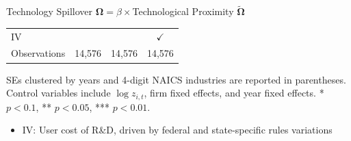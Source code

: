 \documentclass[
  10pt,
  aspectratio=169,   %
]{beamer}
\theoremstyle{plain}
\begin{document}
\begin{frame}{Technology Spillover $\bm{\Omega}=\beta\times$Technological Proximity $\bm{\widetilde{\Omega}}$ \hyperlink{first_stage}{}}
{\begin{center}
\begin{tabular}{lccc}
        IV               &                                                                       &              & $\checkmark$ \\
        Observations     & 14,576                                                                & 14,576       & 14,576       \\
        \hline\hline
      \end{tabular}
    \end{center}
    SEs clustered by years and 4-digit NAICS industries are reported in parentheses. Control variables include $\log z_{i,t}$, firm fixed effects, and year fixed effects.
      {*} $p<\text{0.1}$, {**} $p<\text{0.05}$, {***} $p<\text{0.01}$.}
  \begin{itemize}
    \item IV: User cost of R\&D, driven by federal and state-specific rules variations \citep{Bloom2013-pn}
  \end{itemize}
\end{frame}
\end{document}
